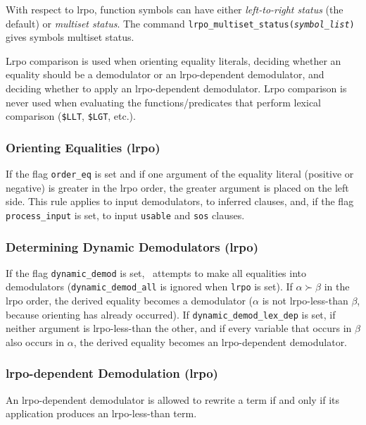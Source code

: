 \documentclass[11pt]{article}
\begin{document}
With respect to {\sc lrpo}, function symbols can have either
{\em left-to-right status} (the default) or {\em multiset status}.
The command {\tt lrpo\_multiset\_status({\it symbol\_list})} gives
symbols multiset status.

{\sc Lrpo} comparison is used when orienting equality literals,
deciding whether an equality should be a demodulator or an
{\sc lrpo}-dependent demodulator, and deciding whether to apply an
{\sc lrpo}-dependent demodulator.  {\sc Lrpo} comparison is never used when
evaluating the functions/predicates that perform lexical comparison
(\verb:$LLT:, \verb:$LGT:, etc.).

\subsubsection{Orienting Equalities ({\sc lrpo})} \label{orient-lrpo}

If the flag \verb:order_eq: is set and if one argument of the equality
literal (positive or negative) is greater in the {\sc lrpo} order, the
greater argument is placed on the left side.  This rule applies to input
demodulators, to inferred clauses, and, if the flag
\verb:process_input: is set, to input \verb:usable: and \verb:sos:
clauses.

\subsubsection{Determining Dynamic Demodulators ({\sc lrpo})} \label{dynamic-lrpo}

If the flag \verb:dynamic_demod: is set, \otter\ attempts to make all
equalities into demodulators (\verb:dynamic_demod_all: is ignored when
\verb:lrpo: is set).  If $\alpha\succ\beta$ in the {\sc lrpo} order, the
derived equality becomes a demodulator  ($\alpha$ is not {\sc
lrpo}-less-than $\beta$, because orienting has already occurred).  If
\verb:dynamic_demod_lex_dep: is set, if neither argument is {\sc
lrpo}-less-than the other, and if every variable that occurs in $\beta$
also occurs in $\alpha$, the derived equality becomes an {\sc
lrpo}-dependent demodulator.

\subsubsection{{\sc lrpo}-dependent Demodulation ({\sc lrpo})} \label{lex-dep-lrpo}

An {\sc lrpo}-dependent demodulator is allowed to rewrite a term if and
only if its application produces an {\sc lrpo}-less-than term.
\end{document}
